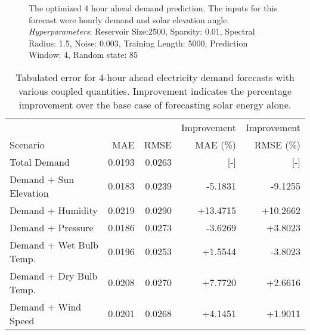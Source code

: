 \begin{figure*}[h]
  \centering
  
  \caption{The optimized 4 hour ahead demand prediction. The inputs for this forecast were hourly demand and solar elevation angle. \textit{Hyperparameters}: Reservoir Size:2500, Sparsity: 0.01, Spectral Radius: 1.5, Noise: 0.003, Training Length: 5000, Prediction Window: 4, Random state: 85}
  \label{fig:demand04}
\end{figure*}

  \begin{table*}[h]
    \centering
    \caption{Tabulated error for 4-hour ahead electricity demand forecasts with various coupled quantities. Improvement indicates the percentage improvement over the base case of forecasting solar energy alone.}
    \label{tab:demand04}
    \begin{tabular}{l|r|r|r|r}
      &  & & Improvement & Improvement \\
      Scenario  & MAE & RMSE & MAE (\%) & RMSE (\%)\\
      \hline
      Total Demand & 0.0193 & 0.0263 & [-] & [-] \\
      Demand + Sun Elevation & 0.0183 & 0.0239 & -5.1831 & -9.1255 \\
      Demand + Humidity & 0.0219 & 0.0290 & +13.4715 & +10.2662 \\
      Demand + Pressure & 0.0186 & 0.0273 & -3.6269 & +3.8023 \\
      Demand + Wet Bulb Temp. & 0.0196 & 0.0253 & +1.5544 & -3.8023 \\
      Demand + Dry Bulb Temp. & 0.0208 & 0.0270 & +7.7720 & +2.6616 \\
      Demand + Wind Speed & 0.0201 & 0.0268 & +4.1451 & +1.9011 \\
    \end{tabular}
  \end{table*}
